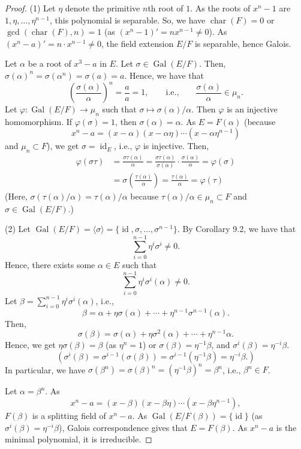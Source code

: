 \documentclass[twoside]{article}
\DeclareMathOperator\Char{char}
\DeclareMathOperator\Gal{Gal}
\DeclareMathOperator\id{id}
\theoremstyle{remark}
\begin{document}
\begin{proof}
  (1) Let \(\eta\) denote the primitive \(n\)th root of \(1\). As the roots of \(x^n-1\) are \(1, \eta, \dots, \eta^{n-1}\), this polynomial is separable. So, we have \(\Char(F) = 0\) or \(\gcd(\Char(F),n) = 1\) (as \((x^n-1)' = nx^{n-1} \neq 0\)). As \((x^n-a)' = n \cdot x^{n-1} \neq 0\), the field extension \(E/F\) is separable, hence Galois.
  
  Let \(\alpha\) be a root of \(x^3-a\) in \(E\). Let \(\sigma \in \Gal(E/F)\). Then, \(\sigma(\alpha)^n = \sigma(\alpha^n) = \sigma(a) = a\). Hence, we have that
  \[ \left(\frac{\sigma(\alpha)}\alpha\right)^n = \frac aa = 1, \qquad \text{i.e.,} \qquad \frac{\sigma(\alpha)}\alpha \in \mu_n. \]
  Let \(\varphi\colon \Gal(E/F) \to \mu_n\) such that \(\sigma \mapsto \sigma(\alpha)/\alpha\). Then \(\varphi\) is an injective homomorphism. If \(\varphi(\sigma) = 1\), then \(\sigma(\alpha) = \alpha\). As \(E = F(\alpha)\) (because
  \[ x^n - a = (x-\alpha) (x-\alpha\eta) \cdots (x-\alpha\eta^{n-1}) \]
  and \(\mu_n \subset F\)), we get \(\sigma = \id_E\), i.e., \(\varphi\) is injective. Then,
  \begin{align*}
    \varphi(\sigma\tau) & = \frac{\sigma\tau(\alpha)}\alpha = \frac{\sigma\tau(\alpha)}{\sigma(\alpha)} \cdot \frac{\sigma(\alpha)}\alpha = \varphi(\sigma) \\
    & = \sigma\left(\frac{\tau(\alpha)}\alpha\right) = \frac{\tau(\alpha)}\alpha = \varphi(\tau)
  \end{align*}
  (Here, \(\sigma(\tau(\alpha)/\alpha) = \tau(\alpha)/\alpha\) because \(\tau(\alpha)/\alpha \in \mu_n \subset F\) and \(\sigma \in \Gal(E/F)\).)
  
  (2) Let \(\Gal(E/F) = \langle\sigma\rangle = \{\id, \sigma, \dots, \sigma^{n-1}\}\). By Corollary 9.2, we have that
  \[ \sum_{i=0}^{n-1} \eta^i \sigma^i \neq 0. \]
  Hence, there exists some \(\alpha \in E\) such that
  \[ \sum_{i=0}^{n-1} \eta^i \sigma^i(\alpha) \neq 0. \]
  Let \(\beta = \sum_{i=0}^{n-1} \eta^i \sigma^i(\alpha)\), i.e., 
  \[ \beta = \alpha + \eta\sigma(\alpha) + \cdots + \eta^{n-1} \sigma^{n-1}(\alpha). \]
  Then,
  \[ \sigma(\beta) = \sigma(\alpha) + \eta \sigma^2(\alpha) + \cdots + \eta^{n-1}\alpha. \]
  Hence, we get \(\eta\sigma(\beta) = \beta\) (as \(\eta^n = 1\)) or \(\sigma(\beta) = \eta^{-1}\beta\), and \(\sigma^i(\beta) = \eta^{-i}\beta\).
  \[ (\sigma^i(\beta) = \sigma^{i-1}(\sigma(\beta)) = \sigma^{i-1}(\eta^{-1}\beta) = \eta^{-i}\beta.) \]
  In particular, we have \(\sigma(\beta^n) = \sigma(\beta)^n = (\eta^{-1}\beta)^n = \beta^n\), i.e., \(\beta^n \in F\).
  
  Let \(\alpha = \beta^n\). As
  \[ x^n - a = (x-\beta) (x-\beta\eta) \cdots (x-\beta\eta^{n-1}), \]
  \(F(\beta)\) is a splitting field of \(x^n-a\). As \(\Gal(E/F(\beta)) = \{\id\}\) (as \(\sigma^i(\beta) = \eta^{-i}\beta\)), Galois correspondence gives that \(E = F(\beta)\). As \(x^n-a\) is the minimal polynomial, it is irreducible.
\end{proof}
\end{document}
